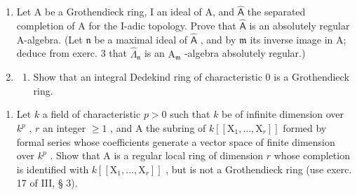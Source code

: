 \begin{enumerate}
\def\labelenumi{\arabic{enumi})}
\setcounter{enumi}{5}
\item
  Let A be a Grothendieck ring, I an ideal of A, and \(\widehat{\mathsf{A}}\) the separated completion of A for the I-adic topology. Prove that \(\widehat{\mathsf{A}}\) is an absolutely regular A-algebra. (Let \(\mathfrak{n}\) be a maximal ideal of \(\widehat{\mathsf{A}}\) , and by \(\mathfrak{m}\) its inverse image in A; deduce from exerc. 3 that \(\widehat{\Lambda}_{\mathfrak{n}}\) is an \(\mathrm{A}_{\mathfrak{m}}\) -algebra absolutely regular.)
\item
  \begin{enumerate}
  \def\labelenumii{\alph{enumii})}
  \tightlist
  \item
    Show that an integral Dedekind ring of characteristic 0 is a Grothendieck ring.
  \end{enumerate}
\end{enumerate}

\begin{enumerate}
\def\labelenumi{\alph{enumi})}
\setcounter{enumi}{1}
\tightlist
\item
  Let \(k\) a field of characteristic \(p > 0\) such that \(k\) be of infinite dimension over \(k^p\) , \(r\) an integer \(\geqslant 1\) , and A the subring of \(k[[\mathrm{X}_1, \ldots, \mathrm{X}_r]]\) formed by formal series whose coefficients generate a vector space of finite dimension over \(k^p\) . Show that A is a regular local ring of dimension \(r\) whose completion is identified with \(k[[\mathrm{X}_1, \ldots, \mathrm{X}_r]]\) , but is not a Grothendieck ring (use exerc. 17 of III, § 3).
\end{enumerate}

